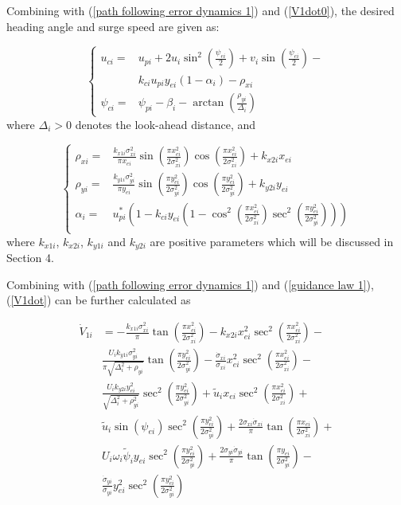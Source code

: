 \documentclass[english]{cccconf}
\begin{document}
Combining with (\ref{path following error dynamics 1}) and (\ref{V1dot0}), the desired heading angle and surge speed are given as:

\begin{equation}\label{guidance law 1}
	\left\{
	\begin{aligned}
		u_{ci}=&u_{pi}+2u_i\sin^2(\frac{\psi_{ei}}{2})+v_i\sin(\frac{\psi_{ei}}{2})-\\
		&k_{ci}u_{pi}y_{ei}(1-\alpha_i)-\rho_{xi}\\
		\psi_{ci}=&\psi_{pi}-\beta_i-\arctan(\frac{\rho_{yi}}{\Delta_i})
	\end{aligned}
	\right.
\end{equation}
where $\Delta_i>0$ denotes the look-ahead distance, and 

\begin{equation}
	\left\{
	\begin{aligned}
		\rho_{xi}=&\frac{k_{x1i}\sigma^2_{xi}}{\pi x_{ei}}\sin(\frac{\pi x^2_{ei}}{2\sigma^2_{xi}})\cos(\frac{\pi x^2_{ei}}{2\sigma^2_{xi}})+k_{x2i}x_{ei}\\
		\rho_{yi}=&\frac{k_{y1i}\sigma^2_{yi}}{\pi y_{ei}}\sin(\frac{\pi y^2_{ei}}{2\sigma^2_{yi}})\cos(\frac{\pi y^2_{ei}}{2\sigma^2_{yi}})+k_{y2i}y_{ei}\\
		\alpha_i=&u^*_{pi}\left(1-k_{ci}y_{ei}\left(1-\cos^2(\frac{\pi x^2_{ei}}{2\sigma^2_{xi}})\sec^2(\frac{\pi y^2_{ei}}{2\sigma^2_{yi}})\right)\right)\\
	\end{aligned}
	\right.
\end{equation}
where $k_{x1i}$, $k_{x2i}$, $k_{y1i}$ and $k_{y2i}$ are positive parameters which will be discussed in Section 4.

Combining with (\ref{path following error dynamics 1}) and (\ref{guidance law 1}), (\ref{V1dot}) can be further calculated as

\begin{equation}\label{V1dot}
	\begin{aligned}
		\dot{V}_{1i}&=-\frac{k_{x1i}\sigma^2_{xi}}{\pi}\tan(\frac{\pi x^2_{ei}}{2\sigma^2_{xi}})-k_{x2i}x^2_{ei}\sec^2(\frac{\pi x^2_{ei}}{2\sigma^2_{xi}})-\\
		&\frac{U_ik_{y1i}\sigma^2_{yi}}{\pi\sqrt{\Delta^2_i+\rho_{yi}}}\tan(\frac{\pi y^2_{ei}}{2\sigma^2_{yi}})-\frac{\dot{\sigma}_{xi}}{\sigma_{xi}}x^2_{ei}\sec^2(\frac{\pi x^2_{ei}}{2\sigma^2_{xi}})-\\
		&\frac{U_ik_{y2i}y^2_{ei}}{\sqrt{\Delta^2_i+\rho^2_{yi}}}\sec^2(\frac{\pi y^2_{ei}}{2\sigma^2_{yi}})+\tilde{u}_ix_{ei}\sec^2(\frac{\pi x^2_{ei}}{2\sigma^2_{xi}})+\\
		&\tilde{u}_i\sin(\psi_{ei})\sec^2(\frac{\pi y^2_{ei}}{2\sigma^2_{yi}})+\frac{2\sigma_{xi}\dot{\sigma}_{xi}}{\pi}\tan(\frac{\pi x_{ei}}{2\sigma^2_{xi}})+\\
		&U_i\omega_i\tilde{\psi}_iy_{ei}\sec^2(\frac{\pi y^2_{ei}}{2\sigma^2_{yi}})+\frac{2\sigma_{yi}\dot{\sigma}_{yi}}{\pi}\tan(\frac{\pi y_{ei}}{2\sigma^2_{yi}})-\\
		&\frac{\dot{\sigma}_{yi}}{\sigma_{yi}}y^2_{ei}\sec^2(\frac{\pi y^2_{ei}}{2\sigma^2_{yi}})
	\end{aligned}
\end{equation}
\end{document}
